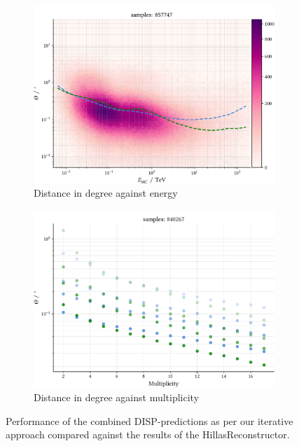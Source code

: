 \begin{figure}
    \centering
    \begin{subfigure}{0.5\textwidth}
        \includegraphics[width=\linewidth]{../analysis/plots/gamma/pairwise_median_100_vs_energy.pdf} 
        \caption{Distance in degree against energy}
    \end{subfigure}
    \begin{subfigure}{0.5\textwidth}
        \includegraphics[width=\linewidth]{../analysis/plots/gamma/pairwise_median_100_vs_multi_comp.pdf}
        \caption{Distance in degree against multiplicity}
    \end{subfigure}
    \caption{Performance of the combined DISP-predictions as per our iterative approach
    compared against the results of the HillasReconstructor.
}
\end{figure}
